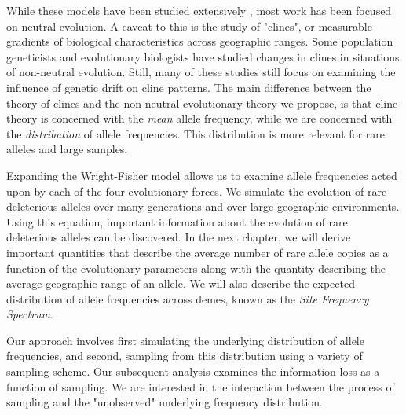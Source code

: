 While these models have been studied extensively \cite{felsenstein_genetic_1975}\cite{malecot_heterozygosity_1975}\cite{sawyer_branching_1976}, most work has been focused on neutral evolution. A caveat to this is the study of "clines", or measurable gradients of biological characteristics across geographic ranges. Some population geneticists and evolutionary biologists have studied changes in clines in situations of non-neutral evolution. \cite{baines_role_2004} Still, many of these studies still focus on examining the influence of genetic drift on cline patterns. \cite{polechova_genetic_2011} The main difference between the theory of clines and the non-neutral evolutionary theory we propose, is that cline theory is concerned with the \textit{mean} allele frequency, while we are concerned with the \textit{distribution} of allele frequencies.\cite{vasemagi_adaptive_2006} This distribution is more relevant for rare alleles and large samples. 


Expanding the Wright-Fisher model allows us to examine allele frequencies acted upon by each of the four evolutionary forces. We simulate the evolution of rare deleterious alleles over many generations and over large geographic environments. Using this equation, important information about the evolution of rare deleterious alleles can be discovered. In the next chapter, we will derive important quantities that describe the average number of rare allele copies as a function of the evolutionary parameters along with the quantity describing the average geographic range of an allele. We will also describe the expected distribution of allele frequencies across demes, known as the \textit{Site Frequency Spectrum}.


Our approach involves first simulating the underlying distribution of allele frequencies, and second, sampling from this distribution using a variety of sampling scheme. Our subsequent analysis examines the information loss as a function of sampling. We are interested in the interaction between the process of sampling and the "unobserved" underlying frequency distribution. 

